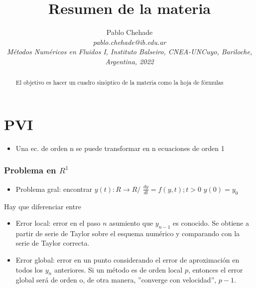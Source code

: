 \documentclass[aps,prb,twocolumn,superscriptaddress,floatfix,longbibliography]{revtex4-2}
\newcounter{para}
\begin{document}
\newcommand{\mytitle}{Resumen de la materia}

\title{\mytitle}

\author{Pablo Chehade \\
    \small \textit{pablo.chehade@ib.edu.ar} \\
    \small \textit{Métodos Numéricos en Fluidos I, Instituto Balseiro, CNEA-UNCuyo, Bariloche, Argentina, 2022} \\}


\begin{abstract}
El objetivo es hacer un cuadro sinóptico de la materia como la hoja de fórmulas
\end{abstract}

\maketitle


\section{PVI}
\begin{itemize}
    \item Una ec. de orden n se puede transformar en n ecuaciones de orden 1
\end{itemize}

\subsubsection{Problema en $R^1$}
\begin{itemize}
    \item Problema gral: encontrar $y(t): R \rightarrow R /$
    $\frac{dy}{dt} = f(y,t); t>0$
    $y(0) = y_0$
\end{itemize}

Hay que diferenciar entre
\begin{itemize}
    \item Error local: error en el paso $n$ asumiento que $y_{n-1}$ es conocido. Se obtiene a partir de serie de Taylor sobre el esquema numérico y comparando con la serie de Taylor correcta.
    \item Error global: error en un punto considerando el error de aproximación en todos los $y_n$ anteriores. Si un método es de orden local $p$, entonces el error global será de orden o, de otra manera, ''converge con velocidad'', $p-1$.
\end{itemize}
\end{document}
